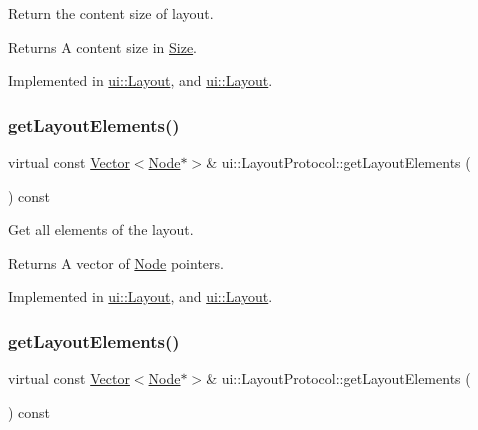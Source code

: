 Return the content size of layout. 

\begin{DoxyReturn}{Returns}
A content size in \hyperlink{classSize}{Size}. 
\end{DoxyReturn}


Implemented in \hyperlink{classui_1_1Layout_a75eb33c244061dd6ab91a37536fd5b8f}{ui\+::\+Layout}, and \hyperlink{classui_1_1Layout_a982a59e5b4697183b4899721842cd3a5}{ui\+::\+Layout}.

\mbox{\label{classui_1_1LayoutProtocol_acd689e1718c903c7e9ed3277eb83b97c}} 
\subsubsection{\texorpdfstring{get\+Layout\+Elements()}{getLayoutElements()}\hspace{0.1cm}{\footnotesize\ttfamily [1/2]}}
{\footnotesize\ttfamily virtual const \hyperlink{classVector}{Vector}$<$\hyperlink{classNode}{Node}$\ast$$>$\& ui\+::\+Layout\+Protocol\+::get\+Layout\+Elements (\begin{DoxyParamCaption}{ }\end{DoxyParamCaption}) const\hspace{0.3cm}{\ttfamily [pure virtual]}}



Get all elements of the layout. 

\begin{DoxyReturn}{Returns}
A vector of \hyperlink{classNode}{Node} pointers. 
\end{DoxyReturn}


Implemented in \hyperlink{classui_1_1Layout_ab80ee89eff7fa311e237e63d72bb18c7}{ui\+::\+Layout}, and \hyperlink{classui_1_1Layout_a832b7950870e62e045456b7565db924d}{ui\+::\+Layout}.

\mbox{\label{classui_1_1LayoutProtocol_acd689e1718c903c7e9ed3277eb83b97c}} 
\subsubsection{\texorpdfstring{get\+Layout\+Elements()}{getLayoutElements()}\hspace{0.1cm}{\footnotesize\ttfamily [2/2]}}
{\footnotesize\ttfamily virtual const \hyperlink{classVector}{Vector}$<$\hyperlink{classNode}{Node}$\ast$$>$\& ui\+::\+Layout\+Protocol\+::get\+Layout\+Elements (\begin{DoxyParamCaption}{ }\end{DoxyParamCaption}) const\hspace{0.3cm}{\ttfamily [pure virtual]}}



